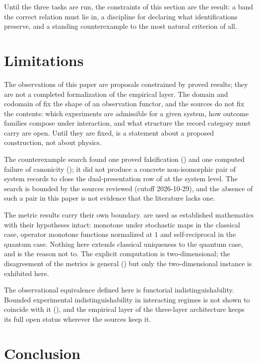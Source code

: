 \documentclass[11pt,letterpaper]{article}
\theoremstyle{definition}
\theoremstyle{remark}
\begin{document}
Until the three tasks are run, the constraints of this section are the result: a band the correct relation must lie in, a discipline for declaring what identifications preserve, and a standing counterexample to the most natural criterion of all.

\section{Limitations}
\label{sec:limits}

The observations of this paper are proposals constrained by proved results; they are not a completed formalization of the empirical layer. The domain and codomain of  fix the shape of an observation functor, and the sources do not fix the contents: which experiments are admissible for a given system, how outcome families compose under interaction, and what structure the record category must carry are open. Until they are fixed,  is a statement about a proposed construction, not about physics.

The counterexample search found one proved falsification () and one computed failure of canonicity (); it did not produce a concrete non-isomorphic pair of system records to close the dual-presentation row of  at the system level. The search is bounded by the sources reviewed (cutoff 2026-10-29), and the absence of such a pair in this paper is not evidence that the literature lacks one.

The metric results carry their own boundary.  are used as established mathematics with their hypotheses intact: monotone under stochastic maps in the classical case, operator monotone functions normalized at $1$ and self-reciprocal in the quantum case. Nothing here extends classical uniqueness to the quantum case, and  is the reason not to. The explicit computation is two-dimensional; the disagreement of the metrics is general () but only the two-dimensional instance is exhibited here.

The observational equivalence defined here is functorial indistinguishability. Bounded experimental indistinguishability in interacting regimes is not shown to coincide with it (), and the empirical layer of the three-layer architecture keeps its full open status wherever the sources keep it.

\section{Conclusion}
\end{document}

